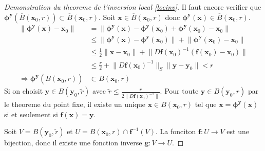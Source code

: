 \begin{proof}[Demonstration du theoreme de l'inversion local \ref{locinv}]
Il faut encore verifier que $\boldsymbol{\phi}^{\boldsymbol{y}}(\overline{B}(\boldsymbol{x}_{0},r))\subset \overline{B}(\boldsymbol{x}_{0},r)$. Soit $\boldsymbol{x}\in \overline{B}(\boldsymbol{x}_{0},r)$ donc $\boldsymbol{\phi}^{\boldsymbol{y}}(\boldsymbol{x})\in \overline{B}(\boldsymbol{x}_{0},r)$.
\begin{align*}
\lVert \boldsymbol{\phi}^{\boldsymbol{y}}(\boldsymbol{x})-\boldsymbol{x}_{0} \rVert  & =\lVert \boldsymbol{\phi}^{\boldsymbol{y}}(\boldsymbol{x})-\boldsymbol{\phi}^{\boldsymbol{y}}(\boldsymbol{x}_{0})+\boldsymbol{\phi^{\boldsymbol{y}}}(\boldsymbol{x}_{0})-\boldsymbol{x}_{0} \rVert  \\
 & \le \lVert \boldsymbol{\phi^{y}}(\boldsymbol{x})-\boldsymbol{\phi^{y}}(\boldsymbol{x}_{0}) \rVert +\lVert \boldsymbol{\phi^{y}}(\boldsymbol{x}_{0})-\boldsymbol{x}_{0} \rVert  \\
 & \le \frac{1}{2}\lVert \boldsymbol{x}-\boldsymbol{x}_{0} \rVert +\lVert D\boldsymbol{f}(\boldsymbol{x}_{0})^{-1}(\boldsymbol{f}(\boldsymbol{x}_{0})-\boldsymbol{x}_{0}) \rVert  \\
 & \le \frac{r}{2}+\lVert D\boldsymbol{f}(\boldsymbol{x}_{0})^{-1} \rVert_{S}  \lVert \boldsymbol{y}-\boldsymbol{y}_{0} \rVert  < r \\
  \Rightarrow \boldsymbol{\phi^{y}}(\overline{B}(\boldsymbol{x}_{0},r)) & \subset B(\boldsymbol{x}_{0},r)
\end{align*}
Si on choisit $\boldsymbol{y}\in B(\boldsymbol{y}_{0},\tilde{r})$ avec $\tilde{r}\le \frac{r}{2\lVert D\boldsymbol{f}(\boldsymbol{x}_{0})^{-1} \rVert}$. Pour toute $\boldsymbol{y}\in B(\boldsymbol{y}_{0},r)$ par le theoreme du point fixe, il existe un unique $\boldsymbol{x}\in \overline{B}(\boldsymbol{x}_{0},r)$ tel que $\boldsymbol{x}=\boldsymbol{\phi^{y}}(\boldsymbol{x})$ si et seulement si $\boldsymbol{f}(\boldsymbol{x})=\boldsymbol{y}$.

Soit $V=B(\boldsymbol{y}_{0},\tilde{r})$ et $U=B(\boldsymbol{x}_{0},r)\cap \boldsymbol{f}^{-1}(V)$. La fonciton $\boldsymbol{f}:U\to V$ est une bijection, donc il existe une fonction inverse $\boldsymbol{g}:V\to U$. 


\end{proof}

